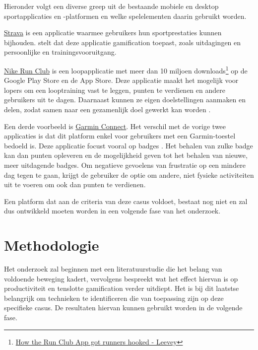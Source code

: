 Hieronder volgt een diverse greep uit de bestaande mobiele en desktop sportapplicaties en -platformen en welke spelelementen daarin gebruikt worden.

\href{https://www.strava.com/}{Strava} is een applicatie waarmee gebruikers hun sportprestaties kunnen bijhouden. \textcite{Barratt2017} stelt dat deze applicatie gamification toepast, zoals uitdagingen en persoonlijke en trainingsvooruitgang.

\href{https://www.nike.com/be/en/nrc-app}{Nike Run Club} is een loopapplicatie met meer dan 10 miljoen downloads\footnote{\href{https://bootcamp.uxdesign.cc/how-the-nike-run-club-app-got-runners-hooked-2850c7654fc5}{How the Run Club App got runners hooked - Leevey}} op de Google Play Store en de App Store. Deze applicatie maakt het mogelijk voor lopers om een looptraining vast te leggen, punten te verdienen en andere gebruikers uit te dagen. Daarnaast kunnen ze eigen doelstellingen aanmaken en delen, zodat samen naar een gezamenlijk doel gewerkt kan worden \autocite{StaalnackeLarsson2013}.

Een derde voorbeeld is \href{https://connect.garmin.com/}{Garmin Connect}. Het verschil met de vorige twee applicaties is dat dit platform enkel voor gebruikers met een Garmin-toestel bedoeld is. Deze applicatie focust vooral op badges \autocite{Ilhan2019}. Het behalen van zulke badge kan dan punten opleveren en de mogelijkheid geven tot het behalen van nieuwe, meer uitdagende badges. Om negatieve gevoelens van frustratie op een mindere dag tegen te gaan, krijgt de gebruiker de optie om andere, niet fysieke activiteiten uit te voeren om ook dan punten te verdienen.

Een platform dat aan de criteria van deze casus voldoet, bestaat nog niet en zal dus ontwikkeld moeten worden in een volgende fase van het onderzoek.


\section{Methodologie}
\label{sec:methodologie}

Het onderzoek zal beginnen met een literatuurstudie die het belang van voldoende beweging kadert, vervolgens bespreekt wat het effect hiervan is op productiviteit en tenslotte gamification verder uitdiept. Het is bij dit laatstse belangrijk om technieken te identificeren die van toepassing zijn op deze specifieke casus. De resultaten hiervan kunnen gebruikt worden in de volgende fase.

